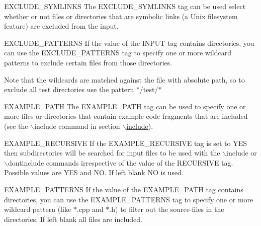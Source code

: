 \begin{DoxyDescription}
\label{config_cfg_exclude_symlinks}
\hypertarget{config_cfg_exclude_symlinks}{}
 
\item[{\ttfamily EXCLUDE\_\-SYMLINKS} ] The {\ttfamily EXCLUDE\_\-SYMLINKS} tag can be used select whether or not files or directories that are symbolic links (a Unix filesystem feature) are excluded from the input.

\label{config_cfg_exclude_patterns}
\hypertarget{config_cfg_exclude_patterns}{}
 
\item[{\ttfamily EXCLUDE\_\-PATTERNS} ] If the value of the {\ttfamily INPUT} tag contains directories, you can use the {\ttfamily EXCLUDE\_\-PATTERNS} tag to specify one or more wildcard patterns to exclude certain files from those directories.

Note that the wildcards are matched against the file with absolute path, so to exclude all test directories use the pattern {\ttfamily $\ast$}{\ttfamily /test/}{\ttfamily $\ast$}

\label{config_cfg_example_path}
\hypertarget{config_cfg_example_path}{}
 
\item[{\ttfamily EXAMPLE\_\-PATH} ] The {\ttfamily EXAMPLE\_\-PATH} tag can be used to specify one or more files or directories that contain example code fragments that are included (see the $\backslash$include command in section \hyperlink{commands_cmdinclude}{$\backslash$include}).

\label{config_cfg_example_recursive}
\hypertarget{config_cfg_example_recursive}{}
 
\item[{\ttfamily EXAMPLE\_\-RECURSIVE} ] If the {\ttfamily EXAMPLE\_\-RECURSIVE} tag is set to {\ttfamily YES} then subdirectories will be searched for input files to be used with the $\backslash$include or $\backslash$dontinclude commands irrespective of the value of the {\ttfamily RECURSIVE} tag. Possible values are {\ttfamily YES} and {\ttfamily NO}. If left blank {\ttfamily NO} is used.

\label{config_cfg_example_patterns}
\hypertarget{config_cfg_example_patterns}{}
 
\item[{\ttfamily EXAMPLE\_\-PATTERNS} ] If the value of the {\ttfamily EXAMPLE\_\-PATH} tag contains directories, you can use the {\ttfamily EXAMPLE\_\-PATTERNS} tag to specify one or more wildcard pattern (like $\ast$.cpp and $\ast$.h) to filter out the source-\/files in the directories. If left blank all files are included.


\end{DoxyDescription}
